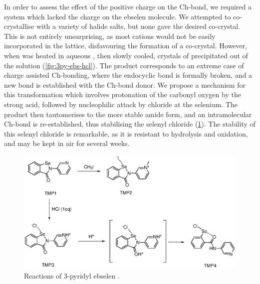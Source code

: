 \begin{refsection}
In order to assess the effect of the positive charge on the Ch-bond, we required a system which lacked the charge on the ebselen molecule.
We attempted to co-crystallise  with a variety of halide salts, but none gave the desired co-crystal.
This is not entirely unsurprising, as most cations would not be easily incorporated in the lattice, disfavouring the formation of a co-crystal.
However, when  was heated in aqueous , then slowly cooled, crystals of  precipitated out of the solution (\cref{fig:3py-ebs-hcl}).
The product  corresponds to an extreme case of charge assisted Ch-bonding, where the endocyclic  bond is formally broken, and a new bond is established with the Ch-bond donor.
We propose a mechanism for this transformation which involves protonation of the carbonyl oxygen by the strong acid, followed by nucleophilic attack by chloride at the selenium.
The product then tautomerises to the more stable amide form, and an intramolecular Ch-bond is re-established, thus stabilising the selenyl chloride (\cref{sch:selenylchloride-mechanism}).
The stability of this selenyl chloride is remarkable, as it is resistant to hydrolysis and oxidation, and may be kept in air for several weeks.

\begin{figure}
    \centering
    \includegraphics[scale=0.8]{Figures/ebs-3py-scheme.eps}
    \caption{Reactions of 3-pyridyl ebselen .}
    \label{sch:selenylchloride-mechanism}
\end{figure}


\end{refsection}
